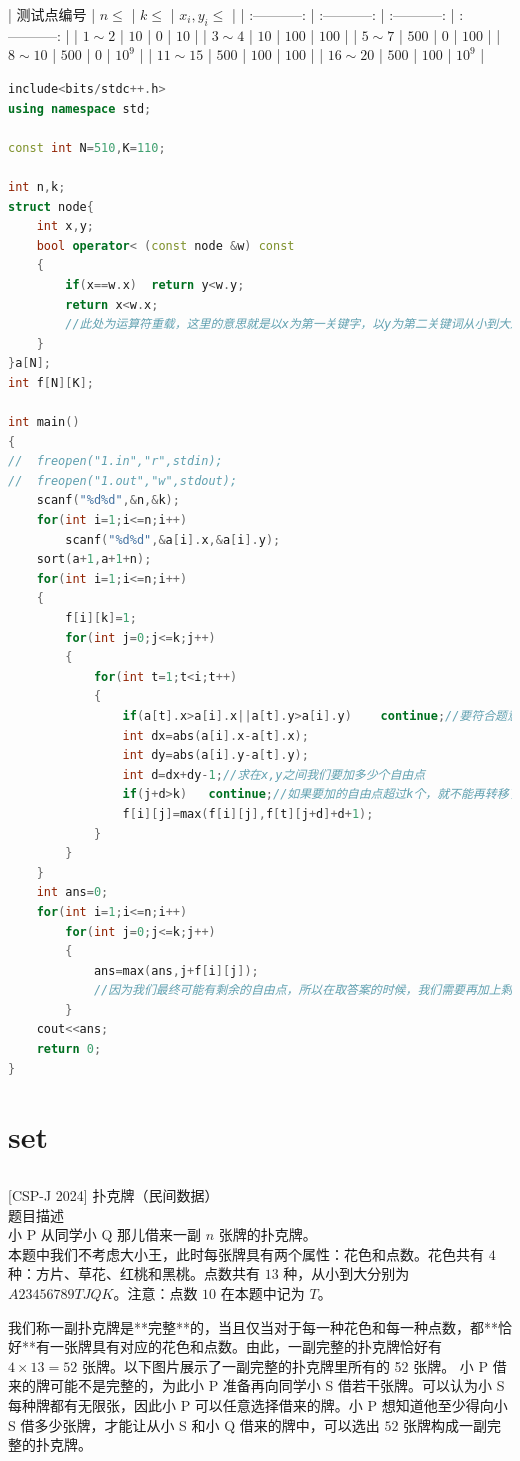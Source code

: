 \documentclass[12pt,twiside,a4paper]{ctexbook}
\numberwithin{chapter}{part}
\begin{document}
| 测试点编号 | $n \leq$ | $k \leq$ | $x_i,y_i \leq$ |
| :-----------: | :-----------: | :-----------: | :-----------: |
| $1 \sim 2$ | $10$ | $0$ | $10$ |
| $3 \sim 4$ | $10$ | $100$ | $100$ |
| $5 \sim 7$ | $500$ | $0$ | $100$ |
| $8 \sim 10$ | $500$ | $0$ | ${10}^9$ |
| $11 \sim 15$ | $500$ | $100$  | $100$ |
| $16 \sim 20$ | $500$ | $100$ | ${10}^9$ |
\begin{lstlisting}[language=c++,breaklines=true]
include<bits/stdc++.h>
using namespace std;

const int N=510,K=110;

int n,k;
struct node{
	int x,y;
	bool operator< (const node &w) const
	{
		if(x==w.x)	return y<w.y;
		return x<w.x;
		//此处为运算符重载，这里的意思就是以x为第一关键字，以y为第二关键词从小到大进行排序
	}
}a[N];
int f[N][K];

int main()
{
//	freopen("1.in","r",stdin);
//	freopen("1.out","w",stdout);
	scanf("%d%d",&n,&k);
	for(int i=1;i<=n;i++)
		scanf("%d%d",&a[i].x,&a[i].y);
	sort(a+1,a+1+n);
	for(int i=1;i<=n;i++)
	{
		f[i][k]=1;
		for(int j=0;j<=k;j++)
		{
			for(int t=1;t<i;t++)
			{
				if(a[t].x>a[i].x||a[t].y>a[i].y)	continue;//要符合题意的序列限制
				int dx=abs(a[i].x-a[t].x);
				int dy=abs(a[i].y-a[t].y);
				int d=dx+dy-1;//求在x,y之间我们要加多少个自由点
				if(j+d>k)	continue;//如果要加的自由点超过k个，就不能再转移了
				f[i][j]=max(f[i][j],f[t][j+d]+d+1);
			}
		}
	}
	int ans=0;
	for(int i=1;i<=n;i++)
		for(int j=0;j<=k;j++)
		{
			ans=max(ans,j+f[i][j]);
			//因为我们最终可能有剩余的自由点，所以在取答案的时候，我们需要再加上剩余的自由点数量
		}
	cout<<ans;
	return 0;
}
\end{lstlisting}

\chapter{set}
\section{}
 [CSP-J 2024] 扑克牌（民间数据）\\
 题目描述\\
小 P 从同学小 Q 那儿借来一副 $n$ 张牌的扑克牌。\\
本题中我们不考虑大小王，此时每张牌具有两个属性：花色和点数。花色共有 $4$ 种：方片、草花、红桃和黑桃。点数共有 $13$ 种，从小到大分别为 $A 2 3 4 5 6 7 8 9 T J Q K$。注意：点数 $10$ 在本题中记为 $T$。

我们称一副扑克牌是**完整**的，当且仅当对于每一种花色和每一种点数，都**恰好**有一张牌具有对应的花色和点数。由此，一副完整的扑克牌恰好有 $4 \times 13 = 52$ 张牌。以下图片展示了一副完整的扑克牌里所有的 52 张牌。
小 P 借来的牌可能不是完整的，为此小 P 准备再向同学小 S 借若干张牌。可以认为小 S 每种牌都有无限张，因此小 P 可以任意选择借来的牌。小 P 想知道他至少得向小 S 借多少张牌，才能让从小 S 和小 Q 借来的牌中，可以选出 $52$ 张牌构成一副完整的扑克牌。
\end{document}

